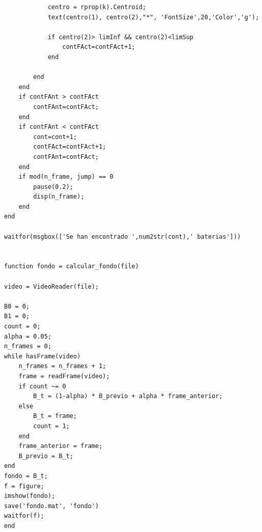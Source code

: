 \documentclass[11pt]{report}
\begin{document}
\begin{lstlisting}
            centro = rprop(k).Centroid;
            text(centro(1), centro(2),"*", 'FontSize',20,'Color','g');
            
            if centro(2)> limInf && centro(2)<limSup
                contFAct=contFAct+1;
            end
            
        end
    end
    if contFAnt > contFAct
        contFAnt=contFAct;
    end
    if contFAnt < contFAct
        cont=cont+1;
        contFAct=contFAct+1;
        contFAnt=contFAct;
    end
    if mod(n_frame, jump) == 0
        pause(0.2);
        disp(n_frame);
    end
end

waitfor(msgbox(['Se han encontrado ',num2str(cont),' baterias']))


function fondo = calcular_fondo(file)

video = VideoReader(file);

B0 = 0;
B1 = 0;
count = 0;
alpha = 0.05;
n_frames = 0;
while hasFrame(video)
    n_frames = n_frames + 1;
    frame = readFrame(video);
    if count ~= 0
        B_t = (1-alpha) * B_previo + alpha * frame_anterior;
    else
        B_t = frame;
        count = 1;
    end
    frame_anterior = frame;
    B_previo = B_t;
end
fondo = B_t;
f = figure;
imshow(fondo);
save('fondo.mat', 'fondo')
waitfor(f);
end




\end{lstlisting}


    
\end{document}
